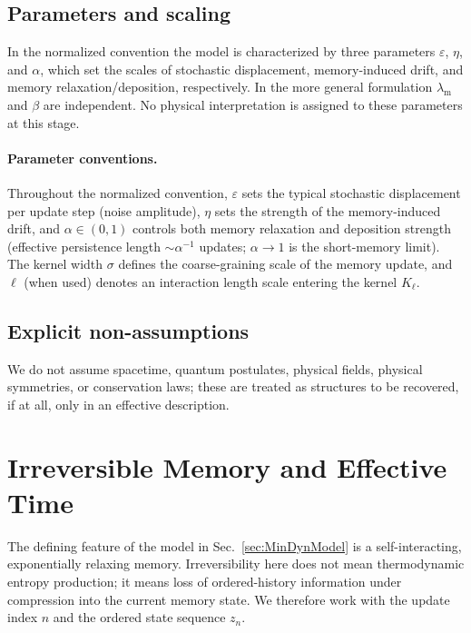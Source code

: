 \documentclass[reprint,amsmath,amssymb,aps,prd,nofootinbib,floatfix]{revtex4-2}
\begin{document}
\subsection{Parameters and scaling}
In the normalized convention the model is characterized by three parameters $\varepsilon$, $\eta$, and $\alpha$, which set the scales of stochastic displacement, memory-induced drift, and memory relaxation/deposition, respectively. In the more general formulation $\lambda_{\mathrm m}$ and $\beta$ are independent. No physical interpretation is assigned to these parameters at this stage.

\paragraph{Parameter conventions.}
Throughout the normalized convention, $\varepsilon$ sets the typical stochastic displacement per update step (noise amplitude), $\eta$ sets the strength of the memory-induced drift, and $\alpha\in(0,1)$ controls both memory relaxation and deposition strength (effective persistence length $\sim\alpha^{-1}$ updates; $\alpha\to1$ is the short-memory limit). The kernel width $\sigma$ defines the coarse-graining scale of the memory update, and $\ell$ (when used) denotes an interaction length scale entering the kernel $K_\ell$.

\subsection{Explicit non-assumptions}

We do not assume spacetime, quantum postulates, physical fields, physical symmetries, or conservation laws; these are treated as structures to be recovered, if at all, only in an effective description.


\section{Irreversible Memory and Effective Time}

The defining feature of the model in Sec.~\ref{sec:MinDynModel} is a self-interacting, exponentially relaxing memory.
Irreversibility here does not mean thermodynamic entropy production; it means loss of ordered-history information under compression into the current memory state.
We therefore work with the update index $n$ and the ordered state sequence $z_n$.
\end{document}
